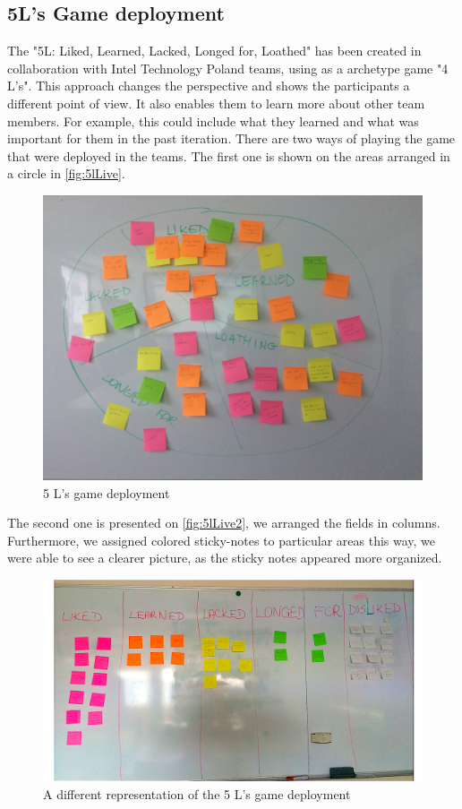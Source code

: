 \subsection{5L's Game deployment}
The "5L: Liked, Learned, Lacked, Longed for, Loathed" has been created in collaboration with Intel Technology Poland teams, using as a archetype game "4 L's". This approach changes the perspective and shows the participants a different point of view. It also enables them to learn more about other team members. For example, this could include what they learned and what was important for them in the past iteration. There are two ways of playing the game that were deployed in the teams. The first one is shown on the areas arranged in a circle in \autoref{fig:5lLive}.

\begin{figure}[!htbp]
\caption{5 L's game deployment}
\label{fig:5lLive}
\centering
\includegraphics[width=1\textwidth]{live/5lLive}
\end{figure}
The second one is presented on \autoref{fig:5lLive2}, we arranged the fields in columns. Furthermore, we assigned colored sticky-notes to particular areas this way, we were able to see a clearer picture, as the sticky notes appeared more organized.
\begin{figure}[!htbp]
\caption{A different representation of the 5 L’s game deployment}
\label{fig:5lLive2}
\centering
\includegraphics[width=1\textwidth]{live/5lLive2}
\end{figure}

